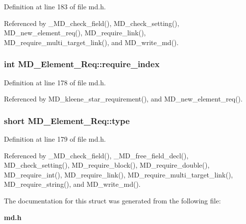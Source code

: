 Definition at line 183 of file md.h.

Referenced by \_\-MD\_\-check\_\-field(), MD\_\-check\_\-setting(), MD\_\-new\_\-element\_\-req(), MD\_\-require\_\-link(), MD\_\-require\_\-multi\_\-target\_\-link(), and MD\_\-write\_\-md().
\subsubsection{\setlength{\rightskip}{0pt plus 5cm}int \bf{MD\_\-Element\_\-Req::require\_\-index}}\label{structMD__Element__Req_fb3216ead024206aa84632504b363a97}




Definition at line 178 of file md.h.

Referenced by MD\_\-kleene\_\-star\_\-requirement(), and MD\_\-new\_\-element\_\-req().
\subsubsection{\setlength{\rightskip}{0pt plus 5cm}short \bf{MD\_\-Element\_\-Req::type}}\label{structMD__Element__Req_b44280197e0bd60f7032f05373352116}




Definition at line 179 of file md.h.

Referenced by \_\-MD\_\-check\_\-field(), \_\-MD\_\-free\_\-field\_\-decl(), MD\_\-check\_\-setting(), MD\_\-require\_\-block(), MD\_\-require\_\-double(), MD\_\-require\_\-int(), MD\_\-require\_\-link(), MD\_\-require\_\-multi\_\-target\_\-link(), MD\_\-require\_\-string(), and MD\_\-write\_\-md().

The documentation for this struct was generated from the following file:\begin{CompactItemize}
\item 
\bf{md.h}\end{CompactItemize}
